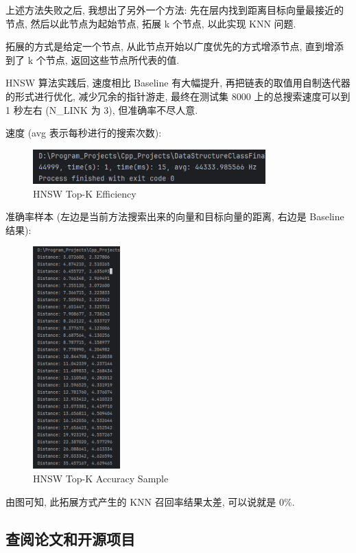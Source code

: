 上述方法失败之后, 我想出了另外一个方法: 先在层内找到距离目标向量最接近的节点, 然后以此节点为起始节点,
拓展 k 个节点, 以此实现 KNN 问题.

拓展的方式是给定一个节点, 从此节点开始以广度优先的方式增添节点, 直到增添到了 k 个节点, 返回这些节点所代表的值.

HNSW 算法实践后, 速度相比 Baseline 有大幅提升, 再把链表的取值用自制迭代器的形式进行优化, 减少冗余的指针游走,
最终在测试集 8000 上的总搜索速度可以到 1 秒左右 (N\_LINK 为 3), 但准确率不尽人意.

速度 (avg 表示每秒进行的搜索次数):

\begin{figure}[H]
    \centering
    \includegraphics[width=0.8\textwidth]{img/hnsw-topk-efficiency}
    \caption{HNSW Top-K Efficiency}
\end{figure}

准确率样本 (左边是当前方法搜索出来的向量和目标向量的距离, 右边是 Baseline 结果):

\begin{figure}[H]
    \centering
    \includegraphics[width=0.3\textwidth]{img/hnsw-topk-accuracy-sample}
    \caption{HNSW Top-K Accuracy Sample}
\end{figure}

由图可知, 此拓展方式产生的 KNN 召回率结果太差, 可以说就是 $0\%$.

\subsection{查阅论文和开源项目}

